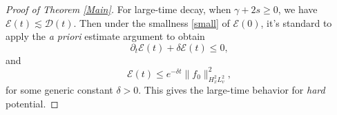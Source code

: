 \documentclass[reqno,a4paper]{amsart}
\numberwithin{equation}{section}
\newcommand{\1}{\mathbf{1}}
\newcommand{\E}{\mathcal{E}}
\newcommand{\D}{\mathcal{D}}
\newcommand{\<}{\langle}
\renewcommand{\>}{\rangle}
\begin{document}
\begin{proof}[Proof of Theorem \ref{Main}]


For large-time decay, when $\gamma+2s\ge 0$, we have $\E(t)\lesssim \D(t)$. Then under the smallness \eqref{small} of $\E(0)$, it's standard to apply the {\em a priori} estimate argument to obtain 
\begin{equation*}
	\partial_t\E(t) + \delta \E(t) \le 0,
\end{equation*}
and 
	\begin{equation*}
	\E(t) \le e^{-\delta t}\|f_0\|^2_{H^2_xL^2_v},
\end{equation*}for some generic constant $\delta>0$. 
This gives the large-time behavior for {\em hard} potential. 


\end{proof}
\end{document}
